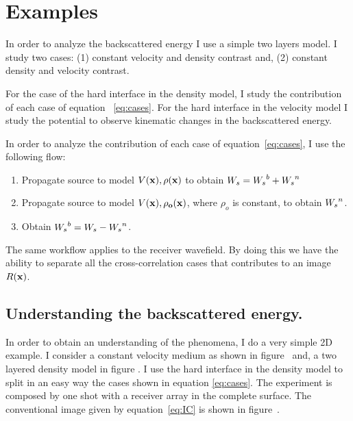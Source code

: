 \section{Examples}
In order to analyze the backscattered energy I use a simple two layers model. I study
 two cases: (1)  constant velocity and density contrast and,
  (2) constant density and velocity contrast.  

For the case of the hard interface in the density model, I study the contribution of each case of 
equation ~\ref{eq:cases}. For the hard interface in the velocity model I study the potential
to observe kinematic changes in the backscattered energy.

In order to analyze the contribution of each case of equation~\ref{eq:cases}, I use the following flow:
\begin{enumerate}
\item Propagate source to model $V(\bf{x}), \rho(\bf{x})$ to obtain ${W_s}={W_s}^b +{W_s}^n$
\item Propagate source to model $V(\bf{x}), \rho_o(\bf{x})$, where
$\rho_o$ is constant, to obtain ${W_s}^n$.
\item Obtain ${W_s}^b= {W_s} -{W_s}^n$.
\end{enumerate}

The same workflow applies to the receiver wavefield. By doing this we have the ability to separate all 
the cross-correlation cases that contributes to an image $R(\bf{x})$.


\subsection{Understanding the backscattered energy.}

In order to obtain an understanding of the phenomena, I do a very simple 2D example. I consider
a constant velocity medium as shown in figure~ and, a two layered density model in figure . I use
the hard interface in the density model to split in an easy way the cases shown in equation \ref{eq:cases}. 
The experiment is composed by one shot with a receiver array in the complete surface. The conventional image
given by equation~\ref{eq:IC} is shown in figure~. 


